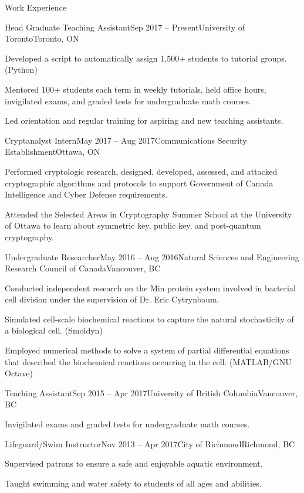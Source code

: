 \documentclass{resume}
\begin{document}
\begin{rSection}{Work Experience}

\begin{rSubsection}{Head Graduate Teaching Assistant}{Sep 2017 -- Present}{University of Toronto}{Toronto, ON}
    \item Developed a script to automatically assign 1,500+ students to tutorial groups. (Python)
    \item Mentored 100+ students each term in weekly tutorials, held office hours, invigilated exams, and graded tests for undergraduate math courses.
    \item Led orientation and regular training for aspiring and new teaching assistants.
\end{rSubsection}

\begin{rSubsection}{Cryptanalyst Intern}{May 2017 -- Aug 2017}{Communications Security Establishment}{Ottawa, ON}
    \item Performed cryptologic research, designed, developed, assessed, and attacked cryptographic algorithms and protocols to support Government of Canada Intelligence and Cyber Defense requirements.
    \item Attended the Selected Areas in Cryptography Summer School at the University of Ottawa to learn about symmetric key, public key, and post-quantum cryptography.
\end{rSubsection}

\begin{rSubsection}{Undergraduate Researcher}{May 2016 -- Aug 2016}{Natural Sciences and Engineering Research Council of Canada}{Vancouver, BC}
    \item Conducted independent research on the Min protein system involved in bacterial cell division under the supervision of Dr. Eric Cytrynbaum.
    \item Simulated cell-scale biochemical reactions to capture the natural stochasticity of a biological cell. (Smoldyn)
    \item Employed numerical methods to solve a system of partial differential equations that described the biochemical reactions occurring in the cell. (MATLAB/GNU Octave)
\end{rSubsection}

\begin{rSubsection}{Teaching Assistant}{Sep 2015 -- Apr 2017}{University of British Columbia}{Vancouver, BC}
    \item Invigilated exams and graded tests for undergraduate math courses.
\end{rSubsection}

\begin{rSubsection}{Lifeguard/Swim Instructor}{Nov 2013 -- Apr 2017}{City of Richmond}{Richmond, BC}
    \item Supervised patrons to ensure a safe and enjoyable aquatic environment.
    \item Taught swimming and water safety to students of all ages and abilities.
\end{rSubsection}

\end{rSection}
\end{document}
